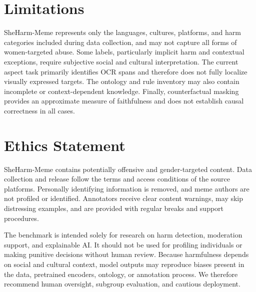 \documentclass[11pt]{article}
\begin{document}
\section*{Limitations}

SheHarm-Meme represents only the languages, cultures, platforms, and
harm categories included during data collection, and may not capture
all forms of women-targeted abuse. Some labels, particularly implicit
harm and contextual exceptions, require subjective social and
cultural interpretation. The current aspect task primarily identifies
OCR spans and therefore does not fully localize visually expressed
targets. The ontology and rule inventory may also contain incomplete
or context-dependent knowledge. Finally, counterfactual masking
provides an approximate measure of faithfulness and does not establish
causal correctness in all cases.
\section*{Ethics Statement}

SheHarm-Meme contains potentially offensive and gender-targeted
content. Data collection and release follow the terms and access
conditions of the source platforms. Personally identifying information
is removed, and meme authors are not profiled or identified. Annotators
receive clear content warnings, may skip distressing examples, and are
provided with regular breaks and support procedures.

The benchmark is intended solely for research on harm detection,
moderation support, and explainable AI. It should not be used for
profiling individuals or making punitive decisions without human
review. Because harmfulness depends on social and cultural context,
model outputs may reproduce biases present in the data, pretrained
encoders, ontology, or annotation process. We therefore recommend
human oversight, subgroup evaluation, and cautious deployment.


\end{document}

